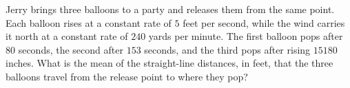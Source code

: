 Jerry brings three balloons to a party and releases them from the same point. Each balloon rises at a constant rate of $5$ feet per second, while the wind carries it north at a constant rate of $240$ yards per minute. The first balloon pops after $80$ seconds, the second after $153$ seconds, and the third pops after rising $15180$ inches. What is the mean of the straight-line distances, in feet, that the three balloons travel from the release point to where they pop?
